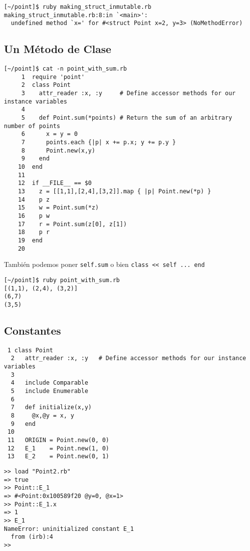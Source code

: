 \begin{verbatim}
[~/point]$ ruby making_struct_inmutable.rb 
making_struct_inmutable.rb:8:in `<main>': 
  undefined method `x=' for #<struct Point x=2, y=3> (NoMethodError)
\end{verbatim}

\subsection{Un Método de Clase}

\begin{verbatim}
[~/point]$ cat -n point_with_sum.rb 
     1  require 'point'
     2  class Point
     3    attr_reader :x, :y     # Define accessor methods for our instance variables
     4  
     5    def Point.sum(*points) # Return the sum of an arbitrary number of points
     6      x = y = 0
     7      points.each {|p| x += p.x; y += p.y }
     8      Point.new(x,y)
     9    end
    10  end
    11  
    12  if __FILE__ == $0
    13    z = [[1,1],[2,4],[3,2]].map { |p| Point.new(*p) }
    14    p z
    15    w = Point.sum(*z)
    16    p w
    17    r = Point.sum(z[0], z[1])
    18    p r
    19  end
    20  
\end{verbatim}

También podemos poner \verb|self.sum| o bien \verb|class << self ... end|

\begin{verbatim}
[~/point]$ ruby point_with_sum.rb 
[(1,1), (2,4), (3,2)]
(6,7)
(3,5)

\end{verbatim}

\subsection{Constantes}

\begin{verbatim}
 1 class Point
  2   attr_reader :x, :y   # Define accessor methods for our instance variables
  3 
  4   include Comparable
  5   include Enumerable
  6 
  7   def initialize(x,y)
  8     @x,@y = x, y
  9   end    
 10   
 11   ORIGIN = Point.new(0, 0)
 12   E_1    = Point.new(1, 0)
 13   E_2    = Point.new(0, 1)
\end{verbatim}

\begin{verbatim}
>> load "Point2.rb"
=> true
>> Point::E_1
=> #<Point:0x100589f20 @y=0, @x=1>
>> Point::E_1.x
=> 1
>> E_1
NameError: uninitialized constant E_1
  from (irb):4
>> 
\end{verbatim}

